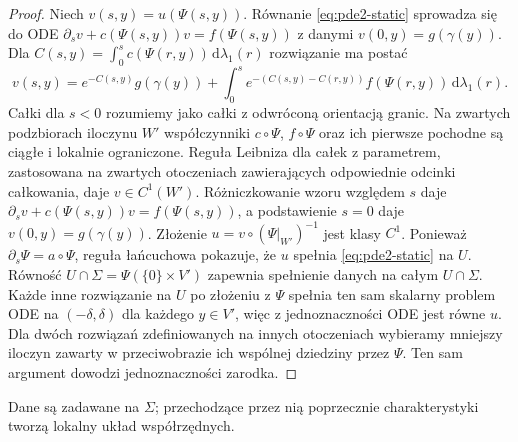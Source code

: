 \begin{proof}
Niech $v(s,y)=u(\Psi(s,y))$. Równanie
\eqref{eq:pde2-static} sprowadza się do ODE
$\partial_sv+c(\Psi(s,y))v=f(\Psi(s,y))$
z danymi $v(0,y)=g(\gamma(y))$. Dla
$C(s,y)=\int_0^s c(\Psi(r,y))\,\mathrm d\lambda_1(r)$ rozwiązanie ma
postać
\[
 v(s,y)=e^{-C(s,y)}g(\gamma(y))+
 \int_0^s e^{-(C(s,y)-C(r,y))}
 f(\Psi(r,y))\,\mathrm d\lambda_1(r).
\]
Całki dla $s<0$ rozumiemy jako całki z odwróconą
orientacją granic. Na zwartych podzbiorach iloczynu $W'$
współczynniki $c\circ\Psi$, $f\circ\Psi$ oraz ich pierwsze
pochodne są ciągłe i lokalnie ograniczone. Reguła Leibniza
dla całek z parametrem, zastosowana na zwartych otoczeniach
zawierających odpowiednie odcinki całkowania, daje $v\in C^1(W')$.
Różniczkowanie wzoru względem $s$ daje
$\partial_s v+c(\Psi(s,y))v=f(\Psi(s,y))$, a podstawienie
$s=0$ daje $v(0,y)=g(\gamma(y))$.
Złożenie $u=v\circ(\Psi|_{W'})^{-1}$ jest klasy $C^1$.
Ponieważ $\partial_s\Psi=a\circ\Psi$, reguła łańcuchowa
pokazuje, że $u$ spełnia \eqref{eq:pde2-static} na $U$.
Równość $U\cap\Sigma=\Psi(\{0\}\times V')$ zapewnia
spełnienie danych na całym $U\cap\Sigma$.
Każde inne rozwiązanie na $U$ po złożeniu z $\Psi$
spełnia ten sam skalarny problem ODE na $(-\delta,\delta)$
dla każdego $y\in V'$, więc z jednoznaczności ODE jest równe $u$.
Dla dwóch rozwiązań zdefiniowanych na innych otoczeniach
wybieramy mniejszy iloczyn zawarty w przeciwobrazie
ich wspólnej dziedziny przez $\Psi$. Ten sam argument
dowodzi jednoznaczności zarodka.
\end{proof}

\begin{center}
\begin{minipage}{\linewidth}
\centering
{}
\par\smallskip\small
Dane są zadawane na $\Sigma$; przechodzące przez nią
poprzecznie charakterystyki tworzą lokalny układ współrzędnych.
\end{minipage}
\end{center}

